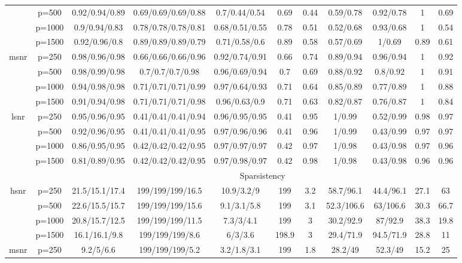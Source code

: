 \begin{table}[ht]
{\begin{tabular}{|c|c|ccccccccc|}
   & p=500 & 0.92/0.94/0.89 & 0.69/0.69/0.69/0.88 & 0.7/0.44/0.54 & 0.69 & 0.44 & 0.59/0.78 & 0.92/0.78 & 1 & 0.69 \\ 
   & p=1000 & 0.9/0.94/0.83 & 0.78/0.78/0.78/0.81 & 0.68/0.51/0.55 & 0.78 & 0.51 & 0.52/0.68 & 0.93/0.68 & 1 & 0.54 \\ 
   & p=1500 & 0.92/0.96/0.8 & 0.89/0.89/0.89/0.79 & 0.71/0.58/0.6 & 0.89 & 0.58 & 0.57/0.69 & 1/0.69 & 0.89 & 0.61 \\ 
  \midrule\multirow{4}[2]{*}{msnr} & p=250 & 0.98/0.96/0.98 & 0.66/0.66/0.66/0.96 & 0.92/0.74/0.91 & 0.66 & 0.74 & 0.89/0.94 & 0.96/0.94 & 1 & 0.92 \\ 
   & p=500 & 0.98/0.99/0.98 & 0.7/0.7/0.7/0.98 & 0.96/0.69/0.94 & 0.7 & 0.69 & 0.88/0.92 & 0.8/0.92 & 1 & 0.91 \\ 
   & p=1000 & 0.94/0.98/0.98 & 0.71/0.71/0.71/0.99 & 0.97/0.64/0.93 & 0.71 & 0.64 & 0.85/0.89 & 0.77/0.89 & 1 & 0.88 \\ 
   & p=1500 & 0.91/0.94/0.98 & 0.71/0.71/0.71/0.98 & 0.96/0.63/0.9 & 0.71 & 0.63 & 0.82/0.87 & 0.76/0.87 & 1 & 0.84 \\ 
  \midrule\multirow{4}[2]{*}{lsnr} & p=250 & 0.95/0.96/0.95 & 0.41/0.41/0.41/0.94 & 0.96/0.95/0.95 & 0.41 & 0.95 & 1/0.99 & 0.52/0.99 & 0.98 & 0.97 \\ 
   & p=500 & 0.92/0.96/0.95 & 0.41/0.41/0.41/0.95 & 0.97/0.96/0.96 & 0.41 & 0.96 & 1/0.99 & 0.43/0.99 & 0.97 & 0.97 \\ 
   & p=1000 & 0.86/0.95/0.95 & 0.42/0.42/0.42/0.95 & 0.97/0.97/0.97 & 0.42 & 0.97 & 1/0.98 & 0.43/0.98 & 0.97 & 0.96 \\ 
   & p=1500 & 0.81/0.89/0.95 & 0.42/0.42/0.42/0.95 & 0.97/0.98/0.97 & 0.42 & 0.98 & 1/0.98 & 0.43/0.98 & 0.96 & 0.96 \\ 
   \midrule 
 \multicolumn{1}{|c}{} &       & \multicolumn{9}{c|}{Sparsistency} \\
\midrule\multirow{4}[2]{*}{hsnr} & p=250 & 21.5/15.1/17.4 & 199/199/199/16.5 & 10.9/3.2/9 & 199 & 3.2 & 58.7/96.1 & 44.4/96.1 & 27.1 & 63 \\ 
   & p=500 & 22.6/15.5/15.7 & 199/199/199/15.6 & 9.1/3.1/5.8 & 199 & 3.1 & 52.3/106.6 & 63/106.6 & 30.3 & 66.7 \\ 
   & p=1000 & 20.8/15.7/12.5 & 199/199/199/11.5 & 7.3/3/4.1 & 199 & 3 & 30.2/92.9 & 87/92.9 & 38.3 & 19.8 \\ 
   & p=1500 & 16.1/16.1/9.8 & 199/199/199/8.6 & 6/3/3.6 & 198.9 & 3 & 29.4/71.9 & 94.5/71.9 & 28.8 & 11 \\ 
  \midrule\multirow{4}[2]{*}{msnr} & p=250 & 9.2/5/6.6 & 199/199/199/5.2 & 3.2/1.8/3.1 & 199 & 1.8 & 28.2/49 & 52.3/49 & 15.2 & 25 \\ 

\end{tabular}}
\end{table}
